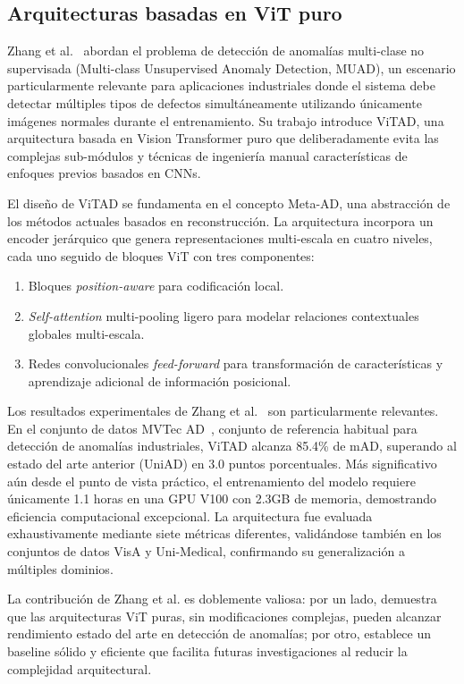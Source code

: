 \subsection{Arquitecturas basadas en ViT puro}

Zhang et al.~\cite{zhang2025exploring} abordan el problema de detección de anomalías multi-clase no supervisada (Multi-class Unsupervised Anomaly Detection, MUAD), un escenario particularmente relevante para aplicaciones industriales donde el sistema debe detectar múltiples tipos de defectos simultáneamente utilizando únicamente imágenes normales durante el entrenamiento. Su trabajo introduce ViTAD, una arquitectura basada en Vision Transformer puro que deliberadamente evita las complejas sub-módulos y técnicas de ingeniería manual características de enfoques previos basados en CNNs.

El diseño de ViTAD se fundamenta en el concepto Meta-AD, una abstracción de los métodos actuales basados en reconstrucción. La arquitectura incorpora un encoder jerárquico que genera representaciones multi-escala en cuatro niveles, cada uno seguido de bloques ViT con tres componentes:
\begin{enumerate}
    \item Bloques \textit{position-aware} para codificación local.
    \item \textit{Self-attention} multi-pooling ligero para modelar relaciones contextuales globales multi-escala.
    \item Redes convolucionales \textit{feed-forward} para transformación de características y aprendizaje adicional de información posicional.
\end{enumerate}

Los resultados experimentales de Zhang et al.~\cite{zhang2025exploring} son particularmente relevantes. En el conjunto de datos MVTec AD~\cite{bergmann2019mvtec}, conjunto de referencia habitual para detección de anomalías industriales, ViTAD alcanza 85.4\% de \acrfull{mAD}, superando al estado del arte anterior (UniAD) en 3.0 puntos porcentuales. Más significativo aún desde el punto de vista práctico, el entrenamiento del modelo requiere únicamente 1.1 horas en una GPU V100 con 2.3GB de memoria, demostrando eficiencia computacional excepcional. La arquitectura fue evaluada exhaustivamente mediante siete métricas diferentes, validándose también en los conjuntos de datos VisA y Uni-Medical, confirmando su generalización a múltiples dominios.

La contribución de Zhang et al. es doblemente valiosa: por un lado, demuestra que las arquitecturas ViT puras, sin modificaciones complejas, pueden alcanzar rendimiento estado del arte en detección de anomalías; por otro, establece un baseline sólido y eficiente que facilita futuras investigaciones al reducir la complejidad arquitectural.

